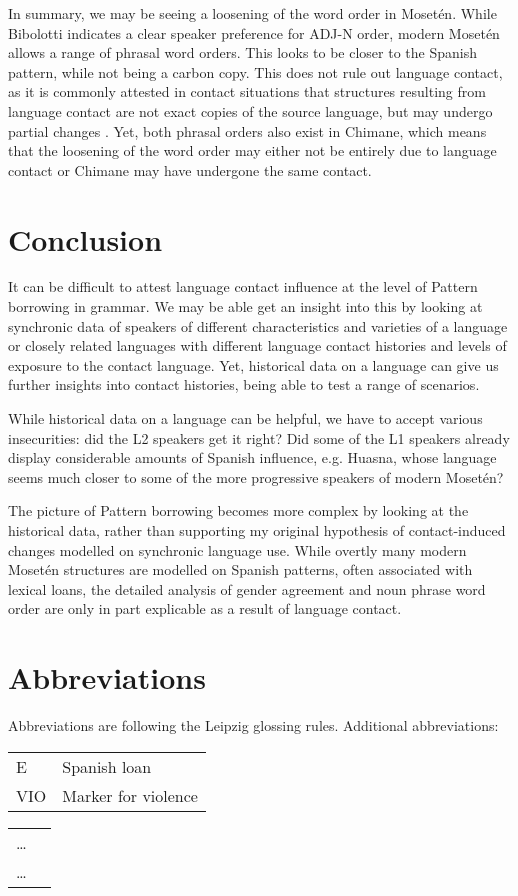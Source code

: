 \documentclass[output=paper,colorlinks,citecolor=brown
]{langscibook}
\begin{document}
In summary, we may be seeing a loosening of the word order in Mosetén. While Bibolotti indicates a clear speaker preference for ADJ-N order, modern Mosetén allows a range of phrasal word orders. This looks to be closer to the Spanish pattern, while not being a carbon copy. This does not rule out language contact, as it is commonly attested in contact situations that structures resulting from language contact are not exact copies of the source language, but may undergo partial changes \citep{heine2005language}. Yet, both phrasal orders also exist in Chimane, which means that the loosening of the word order may either not be entirely due to language contact or Chimane may have undergone the same contact.


\section{Conclusion}
It can be difficult to attest language contact influence at the level of Pattern borrowing in grammar. We may be able get an insight into this by looking at synchronic data of speakers of different characteristics and varieties of a language or closely related languages with different language contact histories and levels of exposure to the contact language. Yet, historical data on a language can give us further insights into contact histories, being able to test a range of scenarios.

While historical data on a language can be helpful, we have to accept various insecurities: did the L2 speakers get it right? Did some of the L1 speakers already display considerable amounts of Spanish influence, e.g. Huasna, whose language seems much closer to some of the more progressive speakers of modern Mosetén?

The picture of Pattern borrowing becomes more complex by looking at the historical data, rather than supporting my original hypothesis of contact-induced changes modelled on synchronic language use. While overtly many modern Mosetén structures are modelled on Spanish patterns, often associated with lexical loans, the detailed analysis of gender agreement and noun phrase word order are only in part explicable as a result of language contact. 



\section*{Abbreviations}
Abbreviations are following the Leipzig glossing rules. Additional abbreviations:
\begin{tabularx}{.5\textwidth}{@{}lQ@{}}
E & Spanish loan\\
VIO & Marker for violence\\ 
\end{tabularx}%
\begin{tabularx}{.5\textwidth}{@{}lQ@{}}
 \ldots  & \\
 \ldots  & \\
\end{tabularx}

\sloppy
\printbibliography[heading=subbibliography,notkeyword=this]
\end{document}
